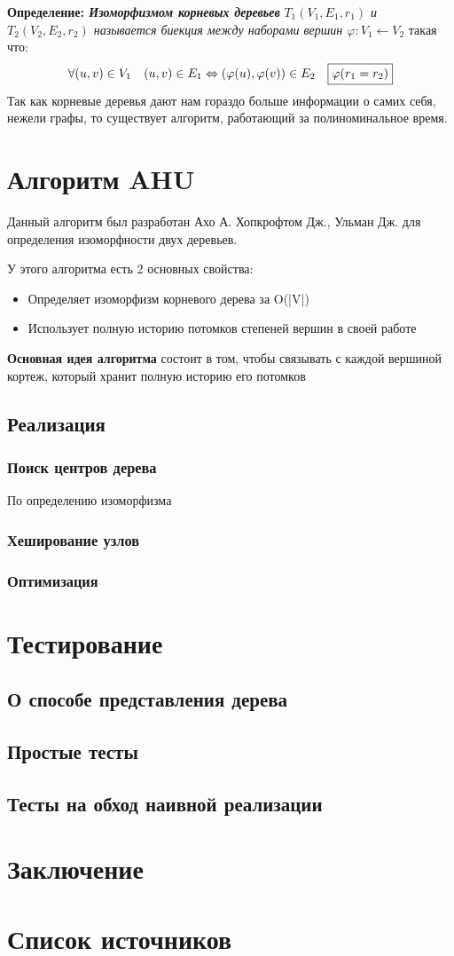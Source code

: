 \documentclass{article}
\begin{document}
	
	\textbf{Определение: \textit {Изоморфизмом корневых деревьев}} 
	\textit{$T_{1}(V_{1},E_{1},r_{1})$ и $T_{2}(V_{2},E_{2},r_{2})$ называется биекция между наборами вершин $\varphi: V_{1} \leftarrow V_{2}$} такая что:
	\textit{$$\forall(u,v)\in V_{1} \quad (u,v)\in E_{1} \Leftrightarrow (\varphi(u),\varphi(v)) \in E_{2}\quad \fbox{$\varphi(r_{1} = r_{2})$} $$}
	\newline
	Так как корневые деревья дают нам гораздо больше информации о самих себя, нежели графы, то существует алгоритм, работающий за полиноминальное время.
	\section{Алгоритм AHU}
	Данный алгоритм был разработан Ахо А. Хопкрофтом Дж., Ульман Дж. для определения изоморфности двух деревьев. 
	
	У этого алгоритма есть 2 основных свойства:
	\begin{itemize}
		\item Определяет изоморфизм корневого дерева за O(|V|)
		\item Использует полную историю потомков степеней вершин в своей работе
	\end{itemize}
	
	\textbf{Основная идея алгоритма} состоит в том, чтобы связывать с каждой вершиной кортеж, который хранит полную историю его потомков
	\subsection{Реализация}
	\subsubsection{Поиск центров дерева}
	По определению изоморфизма 
	\subsubsection{Хеширование узлов}
	\subsubsection{Оптимизация}
	\section{Тестирование}
	\subsection{О способе представления дерева}
	\subsection{Простые тесты}
	\subsection{Тесты на обход наивной реализации}
	\section{Заключение}
	\section{Список источников}
\end{document}
